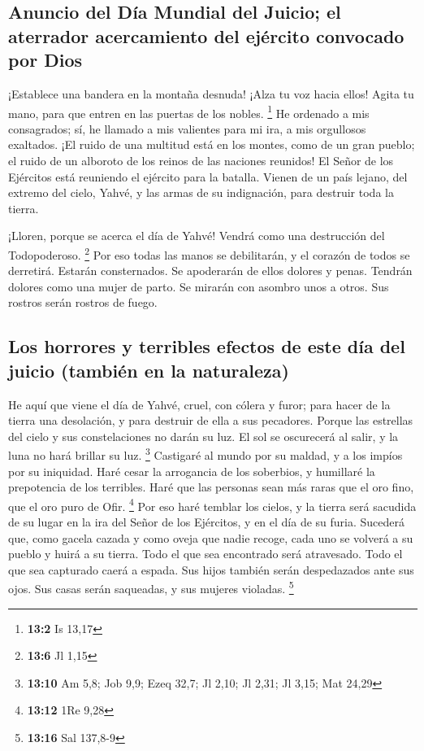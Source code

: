 \begin{paracol}{2}
{\subsection{Anuncio del Día Mundial del Juicio; el aterrador
acercamiento del ejército convocado por
Dios}\label{anuncio-del-duxeda-mundial-del-juicio-el-aterrador-acercamiento-del-ejuxe9rcito-convocado-por-dios}}

 ¡Establece una bandera en la montaña desnuda! ¡Alza tu
voz hacia ellos! Agita tu mano, para que entren en las puertas de los
nobles. \footnote{\textbf{13:2} Is 13,17}  He ordenado a
mis consagrados; sí, he llamado a mis valientes para mi ira, a mis
orgullosos exaltados.  ¡El ruido de una multitud está en
los montes, como de un gran pueblo; el ruido de un alboroto de los
reinos de las naciones reunidos! El Señor de los Ejércitos está
reuniendo el ejército para la batalla.  Vienen de un país
lejano, del extremo del cielo, Yahvé, y las armas de su indignación,
para destruir toda la tierra.

 ¡Lloren, porque se acerca el día de Yahvé! Vendrá como
una destrucción del Todopoderoso. \footnote{\textbf{13:6} Jl 1,15}
 Por eso todas las manos se debilitarán, y el corazón de
todos se derretirá.  Estarán consternados. Se apoderarán
de ellos dolores y penas. Tendrán dolores como una mujer de parto. Se
mirarán con asombro unos a otros. Sus rostros serán rostros de fuego.

\hypertarget{los-horrores-y-terribles-efectos-de-este-duxeda-del-juicio-tambiuxe9n-en-la-naturaleza}{%
\subsection{Los horrores y terribles efectos de este día del juicio
(también en la
naturaleza)}\label{los-horrores-y-terribles-efectos-de-este-duxeda-del-juicio-tambiuxe9n-en-la-naturaleza}}

 He aquí que viene el día de Yahvé, cruel, con cólera y
furor; para hacer de la tierra una desolación, y para destruir de ella a
sus pecadores.  Porque las estrellas del cielo y sus
constelaciones no darán su luz. El sol se oscurecerá al salir, y la luna
no hará brillar su luz. \footnote{\textbf{13:10} Am 5,8; Job 9,9; Ezeq
  32,7; Jl 2,10; Jl 2,31; Jl 3,15; Mat 24,29}  Castigaré
al mundo por su maldad, y a los impíos por su iniquidad. Haré cesar la
arrogancia de los soberbios, y humillaré la prepotencia de los
terribles.  Haré que las personas sean más raras que el
oro fino, que el oro puro de Ofir. \footnote{\textbf{13:12} 1Re 9,28}
 Por eso haré temblar los cielos, y la tierra será
sacudida de su lugar en la ira del Señor de los Ejércitos, y en el día
de su furia.  Sucederá que, como gacela cazada y como
oveja que nadie recoge, cada uno se volverá a su pueblo y huirá a su
tierra.  Todo el que sea encontrado será atravesado. Todo
el que sea capturado caerá a espada.  Sus hijos también
serán despedazados ante sus ojos. Sus casas serán saqueadas, y sus
mujeres violadas. \footnote{\textbf{13:16} Sal 137,8-9}


\end{paracol}

